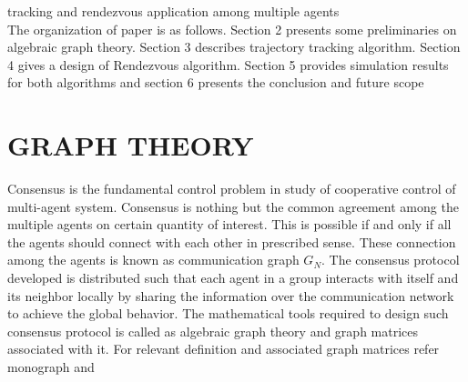 \documentclass[twocolumn]{IETEJR}
\begin{document}
tracking and rendezvous application among multiple agents \\

The organization of paper is as follows. Section 2 presents some preliminaries on algebraic graph theory. Section 3 describes trajectory tracking algorithm. Section 4 gives a design of Rendezvous algorithm. Section 5 provides simulation results for both algorithms and section 6 presents the conclusion and future scope 

\section{GRAPH THEORY}
Consensus is the fundamental control problem in study of cooperative control of multi-agent system. Consensus is nothing but the common agreement among the multiple agents on certain quantity of interest. This is possible if and only if all the agents should connect with each other in prescribed sense. These connection among the agents is known as communication graph $G_{N}$. The consensus protocol developed is distributed such that each agent in a group interacts with itself and its neighbor locally by sharing the information over the communication network to achieve the global behavior. The mathematical tools required to design such consensus protocol is called as algebraic graph theory and graph matrices associated with it. For relevant definition and associated graph matrices refer monograph \cite{15} and \cite{16} \\

\end{document}
